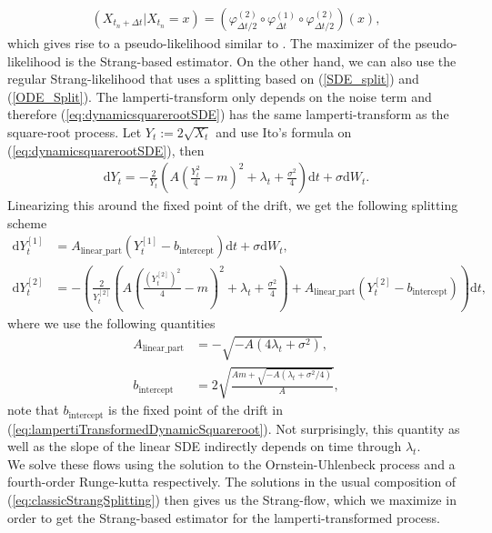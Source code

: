 \begin{align}
    \left(X_{t_n + \Delta t} | X_{t_n} = x\right) = \left(\varphi_{\Delta t/2}^{(2)} \circ \varphi_{\Delta t}^{(1)} \circ \varphi_{\Delta t/2}^{(2)}\right)(x),
\end{align} 
which gives rise to a pseudo-likelihood similar to \cite[(14)]{SplittingSchemes}. The maximizer of the pseudo-likelihood is the Strang-based estimator.
On the other hand, we can also use the regular Strang-likelihood that uses a splitting based on (\ref{SDE_split}) and (\ref{ODE_Split}). The lamperti-transform only depends on the noise term and therefore (\ref{eq:dynamicsquarerootSDE}) has the same lamperti-transform as the square-root process. Let $Y_t:= 2\sqrt{X_t}$ and use Ito's formula on (\ref{eq:dynamicsquarerootSDE}), then
\begin{align}
    \mathrm{d}Y_t = - \frac{2}{Y_t}\left(A\left(\frac{Y_t^2}{4} - m\right)^2 + \lambda_t + \frac{\sigma^2}{4}\right)\mathrm{d}t + \sigma \mathrm{d}W_t. \label{eq:lampertiTransformedDynamicSquareroot}
\end{align}
Linearizing this around the fixed point of the drift, we get the following splitting scheme
\begin{align}
    \mathrm{d}Y_t^{[1]} &= A_{\mathrm{linear\_part}}\left(Y_t^{[1]} - b_{\mathrm{intercept}}\right)\mathrm{d}t + \sigma \mathrm{d}W_t, \label{eq:lampertiSquarerootSplitting1}\\
    \mathrm{d}Y_t^{[2]} &= - \left(\frac{2}{Y_t^{[2]}}\left(A\left(\frac{\left(Y_t^{[2]}\right)^2}{4} - m\right)^2 + \lambda_t + \frac{\sigma^2}{4}\right) + A_{\mathrm{linear\_part}}\left(Y_t^{[2]} - b_{\mathrm{intercept}}\right)\right)\mathrm{d}t,
\end{align}
where we use the following quantities
\begin{align}
    A_{\mathrm{linear\_part}} &= -\sqrt{-A\left(4\lambda_t + \sigma^2\right)},\\
    b_{\mathrm{intercept}} &= 2 \sqrt{\frac{Am + \sqrt{-A\left(\lambda_t + \sigma^2/4\right)}}{A}},
\end{align}
note that $b_{\mathrm{intercept}}$ is the fixed point of the drift in (\ref{eq:lampertiTransformedDynamicSquareroot}). Not surprisingly, this quantity as well as the slope of the linear SDE indirectly depends on time through $\lambda_t$. \\
We solve these flows using the solution to the Ornstein-Uhlenbeck process and a fourth-order Runge-kutta respectively. The solutions in the usual composition of (\ref{eq:classicStrangSplitting}) then gives us the Strang-flow, which we maximize in order to get the Strang-based estimator for the lamperti-transformed process.
